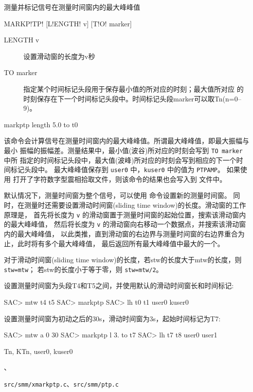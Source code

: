 \label{cmd:markptp}

测量并标记信号在测量时间窗内的最大峰峰值

\begin{SACSTX}
MARKP!TP! [L!ENGTH! v] [T!O! marker]
\end{SACSTX}

\begin{description}
\item [LENGTH v] 设置滑动窗的长度为v秒
\item [TO marker] 指定某个时间标记头段用于保存最小值的所对应的时刻；最大值所对应
    的时刻保存在下一个时间标记头段中。时间标记头段marker可以取Tn(n=0--9)。
\end{description}

\begin{SACDFT}
markptp length 5.0 to t0
\end{SACDFT}

该命令会计算信号在测量时间窗内的最大峰峰值。所谓最大峰峰值，即最大振幅与最小
振幅的振幅差。测量结果中，最小值(波谷)所对应的时刻会写到 \texttt{TO marker} 中所
指定的时间标记头段中，最大值(波峰)所对应的时刻会写到相应的下一个时间标记头段中。
最大峰峰值保存到 \texttt{user0} 中，\texttt{kuser0} 中的值为 \texttt{PTPAMP}。
如果使用  打开了字符数字型震相拾取文件，则该命令的结果也会写入到
文件中。

默认情况下，测量时间窗为整个信号，可以使用  命令设置新的测量时间窗。
同时，在测量时还需要设置滑动时间窗(sliding time window)的长度。滑动窗的工作原理是，
首先将长度为 \texttt{v} 的滑动窗置于测量时间窗的起始位置，搜索该滑动窗内的最大峰峰值，
然后将长度为 \texttt{v} 的滑动窗向右移动一个数据点，并搜索该滑动窗内的最大峰峰值，
以此类推，直到滑动窗的右边界与测量时间窗的右边界重合为止，此时将有多个最大峰峰值，
最后返回所有最大峰峰值中最大的一个。

对于滑动时间窗(sliding time window)的长度，若stw的长度大于mtw的长度，则 \texttt{stw=mtw}；
若stw的长度小于等于零，则 \texttt{stw=mtw/2}。

设置测量时间窗为头段T4和T5之间，并使用默认的滑动时间窗长和时间标记:
\begin{SACCode}
SAC> mtw t4 t5
SAC> markptp
SAC> lh t0 t1 user0 kuser0
\end{SACCode}

设置测量时间窗为初动之后的30s，滑动时间窗为3s，起始时间标记为T7:
\begin{SACCode}
SAC> mtw a 0 30
SAC> markptp l 3. to t7
SAC> lh t7 t8 user0 user1
\end{SACCode}

Tn, KTn, user0, kuser0

、

\texttt{src/smm/xmarkptp.c}、\texttt{src/smm/ptp.c}
